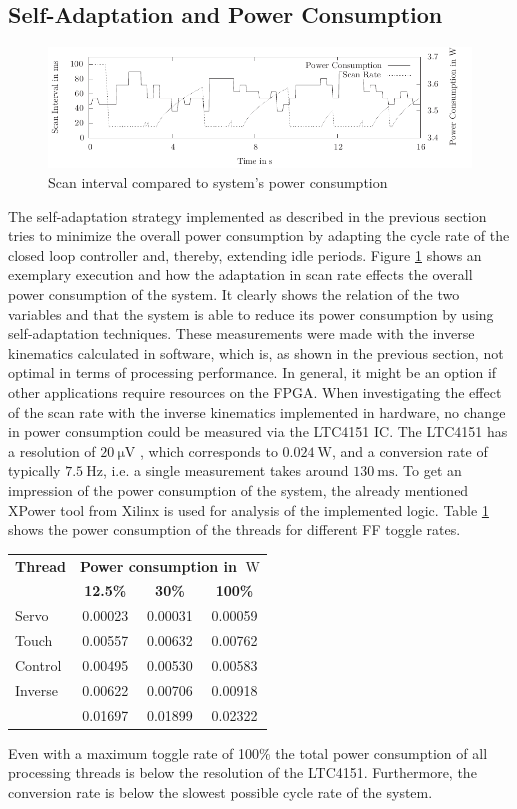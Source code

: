 \subsection{Self-Adaptation and Power Consumption}
\begin{figure}
	\centering
	\includegraphics{../figures/selfadapt_pw}
	\caption{Scan interval compared to system's power consumption}
	\label{fig:selfadapt_pw}
\end{figure}
The self-adaptation strategy implemented as described in the previous section
tries to minimize the overall power consumption by adapting the cycle rate of
the closed loop controller and, thereby, extending idle periods. Figure
\ref{fig:selfadapt_pw} shows an exemplary execution and how the adaptation in
scan rate effects the overall power consumption of the system. It clearly
shows the relation of the two variables and that the system is able to reduce
its power consumption by using self-adaptation techniques. These measurements
were made with the inverse kinematics calculated in software, which is, as
shown in the previous section, not optimal in terms of processing performance.
In general, it might be an option if other applications require resources on
the \ac{FPGA}. When investigating the effect of the scan rate with the inverse
kinematics implemented in hardware, no change in power consumption could be
measured via the LTC4151 \ac{IC}. The LTC4151 has a resolution of
$\SI{20}{\micro\volt}$ \citep{LTC4151}, which corresponds to
$\SI{0.024}{\watt}$, and a conversion rate of typically $\SI{7.5}{\hertz}$,
i.e. a single measurement takes around $\SI{130}{\milli\second}$. To get an
impression of the power consumption of the system, the already mentioned
XPower tool from Xilinx is used for analysis of the implemented logic. Table
\ref{tab:xpower} shows the power consumption of the threads for different
\ac{FF} toggle rates.
\begin{table}
	\scriptsize
	\centering
	\label{tab:xpower}
	\begin{tabular}{lccc}
	\hline
	\textbf{Thread} & \multicolumn{3}{c}{\textbf{Power consumption in $\SI{}{\watt}$}}\\
	& \textbf{12.5\%} & \textbf{30\%} & \textbf{100\%}\\
	\hline
	Servo & 0.00023 & 0.00031 & 0.00059\\
	Touch & 0.00557 & 0.00632 & 0.00762\\
	Control & 0.00495 & 0.00530 & 0.00583\\
	Inverse & 0.00622 & 0.00706 & 0.00918\\
	\hline
	& 0.01697 & 0.01899 & 0.02322\\
	\hline
	\end{tabular}
\end{table}
Even with a maximum toggle rate of 100\% the total power consumption of all
processing threads is below the resolution of the LTC4151. Furthermore, the
conversion rate is below the slowest possible cycle rate of the system.